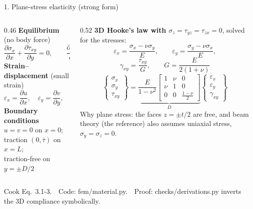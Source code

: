 \documentclass[aspectratio=169,10pt]{beamer}
\newcommand{\src}[1]{{\color{muted}\scriptsize #1}}
\begin{document}
\begin{frame}{1. Plane-stress elasticity (strong form)}
  \begin{columns}[T]
    \begin{column}{0.46\textwidth}
      \textbf{Equilibrium} (no body force)
      \[
        \frac{\partial\sigma_x}{\partial x}+\frac{\partial\tau_{xy}}{\partial y}=0,\qquad
        \frac{\partial\tau_{xy}}{\partial x}+\frac{\partial\sigma_y}{\partial y}=0
      \]
      \textbf{Strain--displacement} (small strain)
      \[
        \varepsilon_x=\frac{\partial u}{\partial x},\quad
        \varepsilon_y=\frac{\partial v}{\partial y},\quad
        \gamma_{xy}=\frac{\partial u}{\partial y}+\frac{\partial v}{\partial x}
      \]
      \textbf{Boundary conditions}\\[2pt]
      $u=v=0$ on $x=0$; traction $(0,\bar\tau)$ on $x=L$;\\
      traction-free on $y=\pm D/2$
    \end{column}
    \begin{column}{0.52\textwidth}
      \textbf{3D Hooke's law with $\sigma_z=\tau_{yz}=\tau_{zx}=0$}, solved for the stresses:
      \[
        \varepsilon_x=\frac{\sigma_x-\nu\sigma_y}{E},\qquad
        \varepsilon_y=\frac{\sigma_y-\nu\sigma_x}{E},
      \]
      \[
        \gamma_{xy}=\frac{\tau_{xy}}{G},\qquad G=\frac{E}{2(1+\nu)}
      \]
      \[
        \boxed{\begin{Bmatrix}\sigma_x\\ \sigma_y\\ \tau_{xy}\end{Bmatrix}
        =\underbrace{\frac{E}{1-\nu^2}\begin{bmatrix}1&\nu&0\\ \nu&1&0\\ 0&0&\frac{1-\nu}{2}\end{bmatrix}}_{D}
        \begin{Bmatrix}\varepsilon_x\\ \varepsilon_y\\ \gamma_{xy}\end{Bmatrix}}
      \]
      Why plane stress: the faces $z=\pm t/2$ are free, and beam theory (the reference)
      also assumes uniaxial stress, $\sigma_y=\sigma_z=0$.
    \end{column}
  \end{columns}
  \vfill
  \src{Cook Eq.~3.1-3.\ \ Code: fem/material.py.\ \ Proof: checks/derivations.py inverts the 3D compliance symbolically.}
\end{frame}
\end{document}
